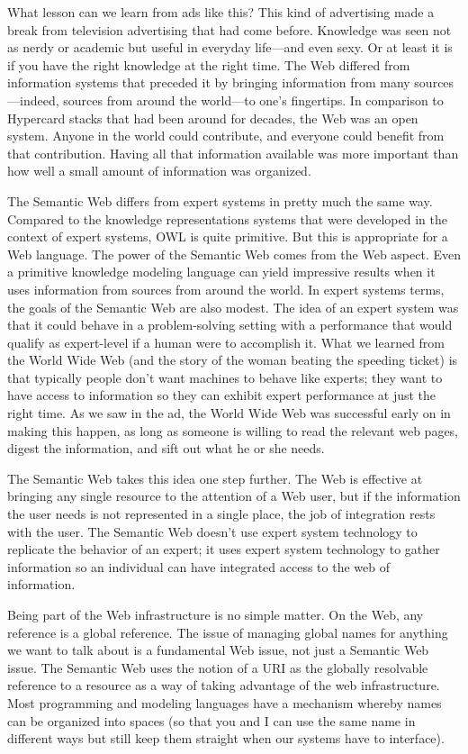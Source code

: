 What lesson can we learn from ads like this? This kind of advertising
made a break from television advertising that had come before. Knowledge
was seen not as nerdy or academic but useful in everyday life---and even
sexy. Or at least it is if you have the right knowledge at the right
time. The Web differed from information systems that preceded it by
bringing information from many sources---indeed, sources from around the
world---to one's fingertips. In comparison to Hypercard stacks that had
been around for decades, the Web was an open system. Anyone in the world
could contribute, and everyone could benefit from that contribution.
Having all that information available was more important than how well a
small amount of information was organized.

The Semantic Web differs from expert systems in pretty much the same
way. Compared to the knowledge representations systems that were
developed in the context of expert systems, OWL is quite
primitive. But this is appropriate for a Web language. The power of the
Semantic Web comes from the Web aspect. Even a primitive knowledge
modeling language can yield impressive results when it uses information
from sources from around the world. In expert systems terms, the goals
of the Semantic Web are also modest. The idea of an expert system was
that it could behave in a problem-solving setting with a performance
that would qualify as expert-level if a human were to accomplish it.
What we learned from the World Wide Web (and the story of the woman
beating the speeding ticket) is that typically people don't want
machines to behave like experts; they want to have access to information
so they can exhibit expert performance at just the right time. As we saw
in the ad, the World Wide Web was successful early on in making this
happen, as long as someone is willing to read the relevant web pages,
digest the information, and sift out what he or she needs.

The Semantic Web takes this idea one step further. The Web is effective
at bringing any single resource to the attention of a Web user, but if
the information the user needs is not represented in a single place, the
job of integration rests with the user. The Semantic Web doesn't use
expert system technology to replicate the behavior of an expert; it uses
expert system technology to gather information so an individual can have
integrated access to the web of information.

Being part of the Web infrastructure is no simple matter. On the Web,
any reference is a global reference. The issue of managing global names
for anything we want to talk about is a fundamental Web issue, not just
a Semantic Web issue. The Semantic Web uses the notion of a URI as the
globally resolvable reference to a resource as a way of taking advantage
of the web infrastructure. Most programming and modeling languages have
a mechanism whereby names can be organized into spaces (so that you and
I can use the same name in different ways but still keep them straight
when our systems have to interface).

